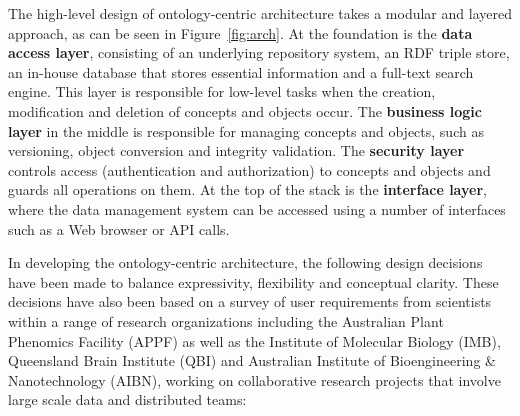 \documentclass{llncs}
\begin{document}
The high-level design of ontology-centric architecture takes a modular
and layered approach, as can be seen in Figure~\ref{fig:arch}. At the
foundation is the \textbf{data access layer}, consisting of an
underlying repository system, an RDF triple store, an in-house database
that stores essential information and a full-text search engine. This
layer is responsible for low-level tasks when the creation,
modification and deletion of concepts and objects occur. The
\textbf{business logic layer} in the middle is responsible for managing
concepts and objects, such as versioning, object conversion and
integrity validation. The \textbf{security layer} controls access
(authentication and authorization) to concepts and objects and guards
all operations on them.
At the top of the stack is the \textbf{interface layer}, where the data
management system can be accessed using a number of interfaces such as
a Web browser or API calls.

In developing the ontology-centric architecture, the following design
decisions have been made to balance expressivity, flexibility and
conceptual clarity. These decisions have also been based on a survey of
user requirements from scientists within a range of research
organizations including the Australian Plant Phenomics Facility (APPF)
as well as the Institute of Molecular Biology (IMB), Queensland Brain
Institute (QBI) and Australian Institute of Bioengineering \&
Nanotechnology (AIBN), working on collaborative research projects that
involve large scale data and distributed teams:
\end{document}
